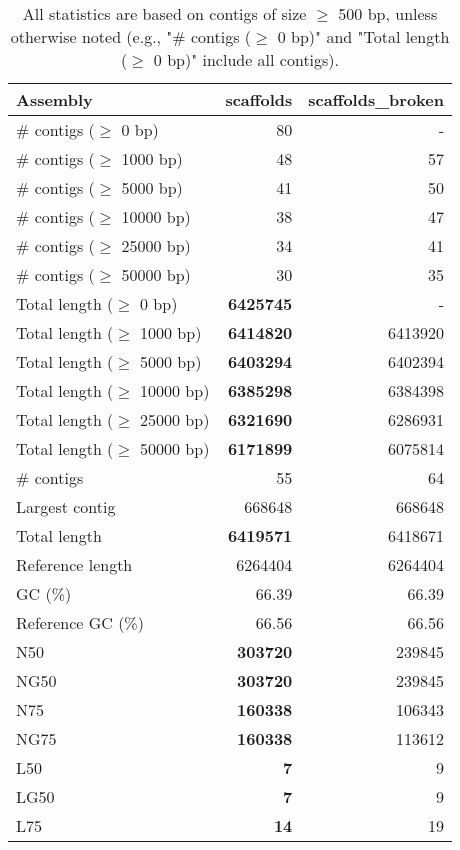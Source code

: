 \documentclass[12pt,a4paper]{article}
\begin{document}
\begin{table}[ht]
\begin{center}
\caption{All statistics are based on contigs of size $\geq$ 500 bp, unless otherwise noted (e.g., "\# contigs ($\geq$ 0 bp)" and "Total length ($\geq$ 0 bp)" include all contigs).}
\begin{tabular}{|l*{2}{|r}|}
\hline
Assembly & scaffolds & scaffolds\_broken \\ \hline
\# contigs ($\geq$ 0 bp) & 80 & - \\ \hline
\# contigs ($\geq$ 1000 bp) & 48 & 57 \\ \hline
\# contigs ($\geq$ 5000 bp) & 41 & 50 \\ \hline
\# contigs ($\geq$ 10000 bp) & 38 & 47 \\ \hline
\# contigs ($\geq$ 25000 bp) & 34 & 41 \\ \hline
\# contigs ($\geq$ 50000 bp) & 30 & 35 \\ \hline
Total length ($\geq$ 0 bp) & {\bf 6425745} & - \\ \hline
Total length ($\geq$ 1000 bp) & {\bf 6414820} & 6413920 \\ \hline
Total length ($\geq$ 5000 bp) & {\bf 6403294} & 6402394 \\ \hline
Total length ($\geq$ 10000 bp) & {\bf 6385298} & 6384398 \\ \hline
Total length ($\geq$ 25000 bp) & {\bf 6321690} & 6286931 \\ \hline
Total length ($\geq$ 50000 bp) & {\bf 6171899} & 6075814 \\ \hline
\# contigs & 55 & 64 \\ \hline
Largest contig & 668648 & 668648 \\ \hline
Total length & {\bf 6419571} & 6418671 \\ \hline
Reference length & 6264404 & 6264404 \\ \hline
GC (\%) & 66.39 & 66.39 \\ \hline
Reference GC (\%) & 66.56 & 66.56 \\ \hline
N50 & {\bf 303720} & 239845 \\ \hline
NG50 & {\bf 303720} & 239845 \\ \hline
N75 & {\bf 160338} & 106343 \\ \hline
NG75 & {\bf 160338} & 113612 \\ \hline
L50 & {\bf 7} & 9 \\ \hline
LG50 & {\bf 7} & 9 \\ \hline
L75 & {\bf 14} & 19 \\ \hline

\end{tabular}
\end{center}
\end{table}
\end{document}

